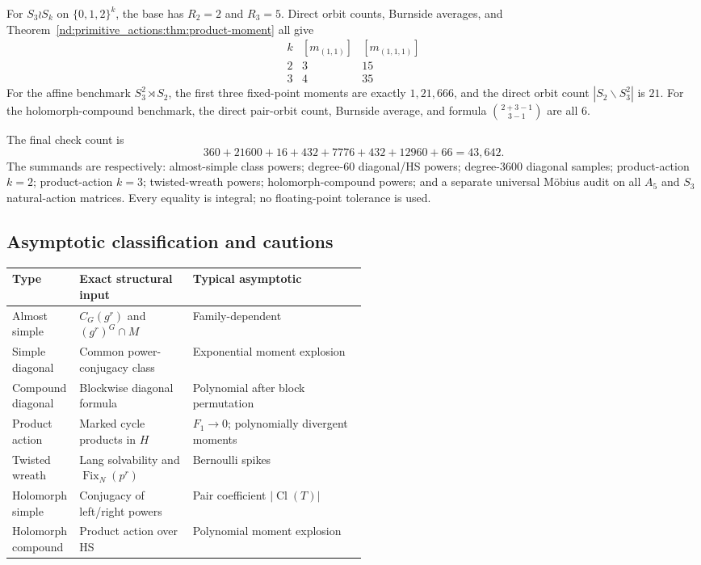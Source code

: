 \documentclass[10pt]{article}
\newcommand{\Fix}{\operatorname{Fix}}
\newcommand{\Cl}{\operatorname{Cl}}
\begin{document}
For $S_3\wr S_k$ on $\{0,1,2\}^k$, the base has $R_2=2$ and $R_3=5$.
Direct orbit counts, Burnside averages, and Theorem~\ref{nd:primitive_actions:thm:product-moment}
all give
\[
\begin{array}{c|cc}
k &[m_{(1,1)}]&[m_{(1,1,1)}]\\ \hline
2&3&15\\
3&4&35
\end{array}
\]
For the affine benchmark $S_3^2\rtimes S_2$, the first three fixed-point
moments are exactly $1,21,666$, and the direct orbit count
$|S_2\backslash S_3^2|$ is $21$.  For the holomorph-compound benchmark, the
direct pair-orbit count, Burnside average, and formula
$\binom{2+3-1}{3-1}$ are all $6$.

The final check count is
\[
 360+21600+16+432+7776+432+12960+66=43{,}642.
\]
The summands are respectively: almost-simple class powers; degree-$60$
diagonal/HS powers; degree-$3600$ diagonal samples; product-action $k=2$;
product-action $k=3$; twisted-wreath powers; holomorph-compound powers; and a
separate universal M\"obius audit on all $A_5$ and $S_3$ natural-action
matrices.  Every equality is integral; no floating-point tolerance is used.

\subsection{Asymptotic classification and cautions}

\begin{center}
\small
\begin{tabularx}{\linewidth}{@{}p{0.19\linewidth}p{0.32\linewidth}X@{}}
\toprule
Type & Exact structural input & Typical asymptotic \\
\midrule
Almost simple & $C_G(g^r)$ and $(g^r)^G\cap M$ & Family-dependent \\
Simple diagonal & Common power-conjugacy class & Exponential moment explosion \\
Compound diagonal & Blockwise diagonal formula & Polynomial after block permutation \\
Product action & Marked cycle products in $H$ & $F_1\to0$; polynomially divergent moments \\
Twisted wreath & Lang solvability and $\Fix_N(p^r)$ & Bernoulli spikes \\
Holomorph simple & Conjugacy of left/right powers & Pair coefficient $|\Cl(T)|$ \\
Holomorph compound & Product action over HS & Polynomial moment explosion \\
\bottomrule
\end{tabularx}
\end{center}
\end{document}
